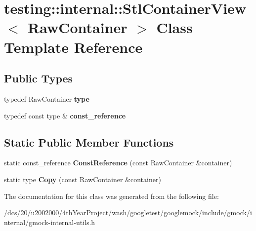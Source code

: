 \hypertarget{classtesting_1_1internal_1_1StlContainerView}{}\section{testing\+:\+:internal\+:\+:Stl\+Container\+View$<$ Raw\+Container $>$ Class Template Reference}
\label{classtesting_1_1internal_1_1StlContainerView}
\subsection*{Public Types}
\begin{DoxyCompactItemize}
\item 
\mbox{\label{classtesting_1_1internal_1_1StlContainerView_a2b2c63a6dcdbfe63fb0ee121ebf463ba}} 
typedef Raw\+Container {\bfseries type}
\item 
\mbox{\label{classtesting_1_1internal_1_1StlContainerView_a9cd4f6ed689b3938cdb7b3c4cbf1b36b}} 
typedef const type \& {\bfseries const\+\_\+reference}
\end{DoxyCompactItemize}
\subsection*{Static Public Member Functions}
\begin{DoxyCompactItemize}
\item 
\mbox{\label{classtesting_1_1internal_1_1StlContainerView_a36eccf53329730f6e55c12002128bf25}} 
static const\+\_\+reference {\bfseries Const\+Reference} (const Raw\+Container \&container)
\item 
\mbox{\label{classtesting_1_1internal_1_1StlContainerView_a441123838221f1284873f66ed968f279}} 
static type {\bfseries Copy} (const Raw\+Container \&container)
\end{DoxyCompactItemize}


The documentation for this class was generated from the following file\+:\begin{DoxyCompactItemize}
\item 
/dcs/20/u2002000/4th\+Year\+Project/wash/googletest/googlemock/include/gmock/internal/gmock-\/internal-\/utils.\+h\end{DoxyCompactItemize}

